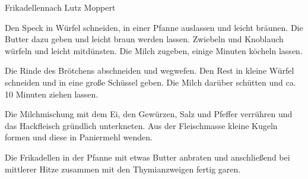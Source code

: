 \begin{recipe}{Frikadellen}{nach Lutz Moppert}
  \label{Frikadellen}
  \inglist

  \steps
  Den Speck in Würfel schneiden, in einer Pfanne auslassen und leicht bräunen. Die Butter
  dazu geben und leicht braun werden lassen. Zwiebeln und Knoblauch würfeln und leicht
  mitdünsten. Die Milch zugeben, einige Minuten köcheln lassen.

  Die Rinde des Brötchens abschneiden und wegwefen. Den Rest in kleine Würfel schneiden
  und in eine große Schüssel geben. Die Milch darüber schütten und ca. 10 Minuten ziehen
  lassen. 

  Die Milchmischung mit dem Ei, den Gewürzen, Salz und Pfeffer verrühren und das
  Hackfleisch gründlich unterkneten. Aus der Fleischmasse kleine Kugeln formen und diese
  in Paniermehl wenden. 
  
  Die Frikadellen in der Pfanne mit etwas Butter anbraten und anschließend bei mittlerer 
  Hitze zusammen mit den Thymianzweigen fertig garen.
\end{recipe}
